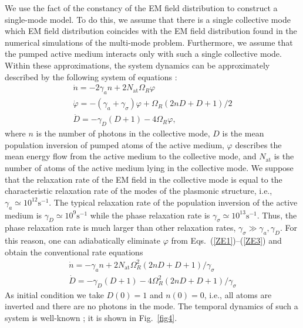 \documentclass[aps,pra,amsmath,amssymb,onecolumn,superscriptaddress,showpacs,floatfix,]{revtex4-1}
\begin{document}
We use the fact of the constancy of the EM field distribution to construct a single-mode model. To do this, we assume that there is a single collective mode which EM field distribution coincides with the EM field distribution found in the numerical simulations of the multi-mode problem. Furthermore, we assume that the pumped active medium interacts only with such a single collective mode. Within these approximations, the system dynamics can be approximately described by the following system of equations \cite{SiegmanLasers}:
\begin{gather} 
\dot n =  - 2{\gamma _a}n + 2{N_{\text{at}}}{\Omega _R}\varphi \label{ZE1}
\\
\dot \varphi = - \left( {{\gamma _a} + {\gamma _\sigma }} \right)\varphi + {\Omega _R}\left( {2nD + D + 1} \right)/2 \label{ZE2}
\\
\dot D =  - {\gamma _D}\left( {D + 1} \right) - 4{\Omega _R}\varphi, \label{ZE3}
\end{gather}
where $n$ is the number of photons in the collective mode, $D$ is the mean population inversion of pumped atoms of the active medium, $\varphi$ describes the mean energy flow from the active medium to the collective mode, and $N_{\text{at}}$ is the number of atoms of the active medium lying in the collective mode.
We suppose that the relaxation rate of the EM field in the collective mode is equal to the characteristic relaxation rate of the modes of the plasmonic structure, i.e., $\gamma_a \simeq 10^{12} \text{s}^{-1}$.
The typical relaxation rate of the population inversion of the active medium is $\gamma_D \simeq 10^9 \text{s}^{-1}$ while the phase relaxation rate is $\gamma_{\sigma}\simeq 10^{13} \text{s}^{-1}$.
Thus, the phase relaxation rate is much larger than other relaxation rates, $\gamma_\sigma \gg \gamma_a, \gamma_D$.
For this reason, one can adiabatically eliminate $\varphi$ from Eqs.~(\ref{ZE1})--(\ref{ZE3}) and obtain the conventional rate equations
\begin{gather} 
\dot n =  - {\gamma _a}n + 2{N_{\text{at}}}\Omega _R^2\left( {2nD + D + 1} \right)/{\gamma _\sigma } \label{RE1}
\\
\dot D =  - {\gamma _D}\left( {D + 1} \right) - 4\Omega _R^2\left( {2nD + D + 1} \right)/{\gamma _\sigma } \label{RE2}
\end{gather}
As initial condition we take $D(0) = 1$ and $n(0) = 0$, i.e., all atoms are inverted and there are no photons in the mode.
The temporal dynamics of such a system is well-known \cite{SiegmanLasers}; it is shown in Fig.~\ref{fig4}.
\end{document}

